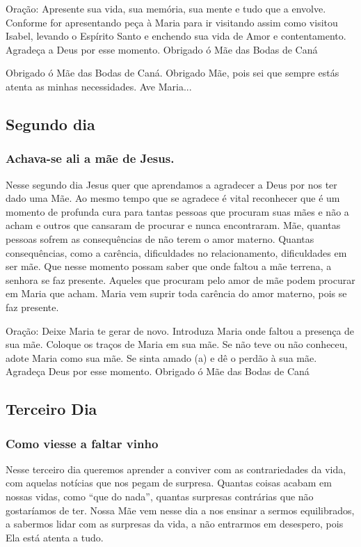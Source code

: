 \documentclass[11pt]{article}
\begin{document}
Oração: Apresente sua vida, sua memória, sua mente e tudo que a envolve.  Conforme for apresentando peça à Maria para ir visitando assim como visitou Isabel, levando o Espírito Santo e enchendo sua vida de Amor e contentamento. Agradeça a Deus por esse momento. Obrigado ó Mãe das Bodas de Caná

Obrigado ó Mãe das Bodas de Caná. Obrigado Mãe, pois sei que sempre estás atenta as minhas necessidades. Ave Maria...

\subsection{Segundo dia}
\subsubsection*{ Achava-se ali a mãe de Jesus.}

Nesse segundo dia Jesus quer que aprendamos a agradecer a Deus por nos ter dado uma Mãe. Ao mesmo tempo que se agradece é vital reconhecer que é um momento de profunda cura para tantas pessoas que procuram suas mães e não a acham e outros que cansaram de procurar e nunca encontraram. Mãe, quantas pessoas sofrem as consequências de não terem o amor materno. Quantas consequências, como a carência, dificuldades no relacionamento, dificuldades em ser mãe. Que nesse momento possam saber que onde faltou a mãe terrena, a senhora se faz presente. Aqueles que procuram pelo amor de mãe podem procurar em Maria que acham. Maria vem suprir toda carência do amor materno, pois se faz presente.

Oração:  Deixe Maria te gerar de novo. Introduza Maria onde faltou a presença de sua mãe. Coloque os traços de Maria em sua mãe. Se não teve ou não conheceu, adote Maria como sua mãe. Se sinta amado (a) e dê o perdão à sua mãe. Agradeça Deus por esse momento. Obrigado ó Mãe das Bodas de Caná

\subsection{Terceiro Dia}
\subsubsection*{Como viesse a faltar vinho}
Nesse terceiro dia queremos aprender a conviver com as contrariedades da vida, com aquelas notícias que nos pegam de surpresa. Quantas coisas acabam em nossas vidas, como “que do nada”, quantas surpresas contrárias que não gostaríamos de ter. Nossa Mãe vem nesse dia a nos ensinar a sermos equilibrados, a sabermos lidar com as surpresas da vida, a não entrarmos em desespero, pois Ela está atenta a tudo.
\end{document}

